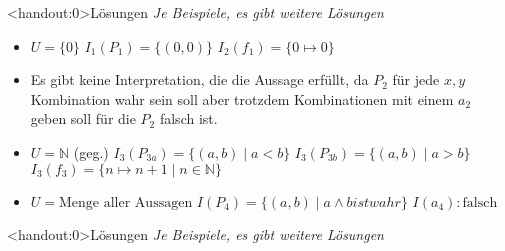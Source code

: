 {\begin{frame}<handout:0>{Lösungen}
    \textit{Je Beispiele, es gibt weitere Lösungen}
    \begin{itemize}[<+- | alert@+>]
        \item $U=\{0\}$ \only<1>{\\}
              $I_1(P_1) = \{(0,0)\}$ 
              $I_2(f_1) = \{0\mapsto 0\}$
        \item Es gibt keine Interpretation, die die Aussage erfüllt, da $P_2$ für jede $x,y$ Kombination wahr sein soll aber trotzdem Kombinationen mit einem $a_2$ geben soll für die $P_2$ falsch ist.
        \item $U=\mathbb{N}$ (geg.) 
              $I_3(P_{3a}) = \{(a,b)\mid a < b\}$ 
              $I_3(P_{3b}) = \{(a,b)\mid a > b\}$ 
              $I_3(f_3) = \{n\mapsto n+1 \mid n\in \mathbb{N}\}$
        \item $U=\text{Menge aller Aussagen}$ 
              $I(P_4)=\{(a,b)\mid a \land b ist wahr\}$ 
              $I(a_4): \text{falsch}$
    \end{itemize}

\end{frame}

\begin{frame}<handout:0>{Lösungen}
    \textit{Je Beispiele, es gibt weitere Lösungen}
    \par
    \par
\end{frame}

}
